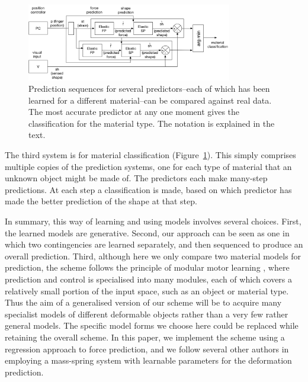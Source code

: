 \documentclass[journal]{IEEEtran}
\begin{document}
\begin{figure}[!t]
\centering
\includegraphics[width=0.8\textwidth]{figures/classification}
\caption{Prediction sequences for several predictors--each of which has been learned for a different material--can be compared against real data. The most accurate predictor at any one moment gives the classification for the material type. The notation is explained in the text.}
\label{fig:classification}
\end{figure}

The third system is for material classification (Figure~\ref{fig:classification}). This simply comprises multiple copies of the prediction systems, one for each type of material that an unknown object might be made of. The predictors each make many-step predictions. At each step a classification is made, based on which predictor has made the better prediction of the shape at that step.

In summary, this way of learning and using models involves several choices. First, the learned models are generative. Second, our approach can be seen as one in which two contingencies are learned separately, and then sequenced to produce an overall prediction. Third, although here we only compare two material models for prediction, the scheme follows the principle of modular motor learning \cite{kopickiwyatt16,haruno2001mosaic}, where prediction and control is specialised into many modules, each of which covers a relatively small portion of the input space, such as an object or material type. Thus the aim of a generalised version of our scheme will be to acquire many specialist models of different deformable objects rather than a very few rather general models. The specific model forms we choose here could be replaced while retaining the overall scheme. In this paper, we implement the scheme using a regression approach to force prediction, and we follow several other authors in employing a mass-spring system with learnable parameters for the deformation prediction.
\end{document}
